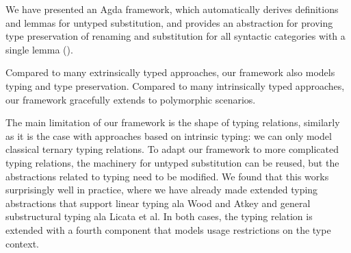 \documentclass[a4paper, UKenglish, cleveref, autoref, thm-restate]{lipics-v2021}
\newcommand*\ACode[1]{\AgdaFontStyle{\textcolor{mygray}{#1}}}
\newcommand*\AField[1]{\AgdaField{#1}}
\begin{document}

  


  We have presented an Agda framework, which automatically derives definitions and lemmas
  for untyped substitution, and provides an abstraction for proving
  type preservation of renaming and substitution for all syntactic
  categories with a single lemma (\ACode{\AField{\_⊢⋯\_}}).

  Compared to many extrinsically typed approaches, our framework also models
  typing and type preservation. Compared to many intrinsically typed approaches, our
  framework gracefully extends to polymorphic scenarios.

  The main limitation of our framework is the shape of typing relations, similarly
  as it is the case with approaches based on intrinsic typing: we can
  only model classical ternary typing relations.
  To adapt our framework to more complicated typing relations, the
  machinery for untyped substitution can be reused, but the
  abstractions related to typing need to be modified.
  We found that this works surprisingly well in practice,
  where we have already made extended typing abstractions that support
  linear typing ala Wood and Atkey\cite{DBLP:journals/corr/abs-2005-02247} and
  general substructural typing ala Licata et al\cite{DBLP:conf/rta/LicataSR17}.
  In both cases, the typing relation is extended with a fourth
  component that models usage restrictions on the type context.
\end{document}
